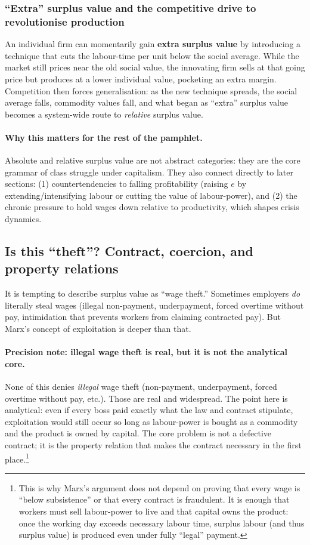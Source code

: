 \subsubsection*{“Extra” surplus value and the competitive drive to revolutionise production}

An individual firm can momentarily gain \textbf{extra surplus value} by introducing a technique that
cuts the labour-time per unit below the social average. While the market still prices near the old
social value, the innovating firm sells at that going price but produces at a lower individual value,
pocketing an extra margin. Competition then forces generalisation: as the new technique spreads,
the social average falls, commodity values fall, and what began as “extra” surplus value becomes a
system-wide route to \emph{relative} surplus value.

\paragraph{Why this matters for the rest of the pamphlet.}
Absolute and relative surplus value are not abstract categories: they are the core grammar of class
struggle under capitalism. They also connect directly to later sections:
(1) countertendencies to falling profitability (raising $e$ by extending/intensifying labour or cutting
the value of labour-power), and
(2) the chronic pressure to hold wages down relative to productivity, which shapes crisis dynamics.


\subsection{Is this ``theft''? Contract, coercion, and property relations}
\label{sec:theft-or-relation}

It is tempting to describe surplus value as ``wage theft.'' Sometimes employers
\emph{do} literally steal wages (illegal non-payment, underpayment, forced overtime without pay, intimidation that prevents workers from claiming contracted pay). But Marx’s concept of exploitation
is deeper than that.

\paragraph{Precision note: illegal wage theft is real, but it is not the analytical core.}
None of this denies \emph{illegal} wage theft (non-payment, underpayment, forced overtime without pay, etc.). Those are real and widespread. The point here is analytical: even if every boss paid exactly what the law and contract stipulate, exploitation would still occur so long as labour-power is bought as a commodity and the product is owned by capital. The core problem is not a defective contract; it is the property relation that makes the contract necessary in the first place.\footnote{This is why Marx’s argument does not depend on proving that every wage is ``below subsistence'' or that every contract is fraudulent. It is enough that workers must sell labour-power to live and that capital owns the product: once the working day exceeds necessary labour time, surplus labour (and thus surplus value) is produced even under fully ``legal'' payment.}

